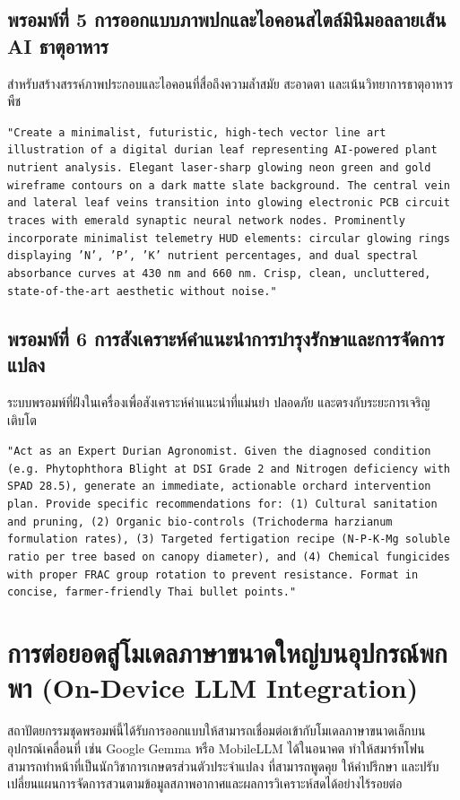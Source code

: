 \subsection{พรอมพ์ที่ 5 การออกแบบภาพปกและไอคอนสไตล์มินิมอลลายเส้น AI ธาตุอาหาร}
สำหรับสร้างสรรค์ภาพประกอบและไอคอนที่สื่อถึงความล้ำสมัย สะอาดตา และเน้นวิทยาการธาตุอาหารพืช

\begin{promptbox}[title={พรอมพ์ที่ 5 การสร้างสรรค์ภาพกราฟิกสไตล์มินิมอลลายเส้น AI ธาตุอาหารพืช}]
\texttt{"Create a minimalist, futuristic, high-tech vector line art illustration of a digital durian leaf representing AI-powered plant nutrient analysis. Elegant laser-sharp glowing neon green and gold wireframe contours on a dark matte slate background. The central vein and lateral leaf veins transition into glowing electronic PCB circuit traces with emerald synaptic neural network nodes. Prominently incorporate minimalist telemetry HUD elements: circular glowing rings displaying 'N', 'P', 'K' nutrient percentages, and dual spectral absorbance curves at 430 nm and 660 nm. Crisp, clean, uncluttered, state-of-the-art aesthetic without noise."}
\end{promptbox}

\subsection{พรอมพ์ที่ 6 การสังเคราะห์คำแนะนำการบำรุงรักษาและการจัดการแปลง}
ระบบพรอมพ์ที่ฝังในเครื่องเพื่อสังเคราะห์คำแนะนำที่แม่นยำ ปลอดภัย และตรงกับระยะการเจริญเติบโต

\begin{promptbox}[title={พรอมพ์ที่ 6 การสังเคราะห์คำแนะนำการดูแลรักษาและการให้ปุ๋ย}]
\texttt{"Act as an Expert Durian Agronomist. Given the diagnosed condition (e.g. Phytophthora Blight at DSI Grade 2 and Nitrogen deficiency with SPAD 28.5), generate an immediate, actionable orchard intervention plan. Provide specific recommendations for: (1) Cultural sanitation and pruning, (2) Organic bio-controls (Trichoderma harzianum formulation rates), (3) Targeted fertigation recipe (N-P-K-Mg soluble ratio per tree based on canopy diameter), and (4) Chemical fungicides with proper FRAC group rotation to prevent resistance. Format in concise, farmer-friendly Thai bullet points."}
\end{promptbox}

\section{การต่อยอดสู่โมเดลภาษาขนาดใหญ่บนอุปกรณ์พกพา (On-Device LLM Integration)}
สถาปัตยกรรมชุดพรอมพ์นี้ได้รับการออกแบบให้สามารถเชื่อมต่อเข้ากับโมเดลภาษาขนาดเล็กบนอุปกรณ์เคลื่อนที่ เช่น Google Gemma หรือ MobileLLM ได้ในอนาคต ทำให้สมาร์ทโฟนสามารถทำหน้าที่เป็นนักวิชาการเกษตรส่วนตัวประจำแปลง ที่สามารถพูดคุย ให้คำปรึกษา และปรับเปลี่ยนแผนการจัดการสวนตามข้อมูลสภาพอากาศและผลการวิเคราะห์สดได้อย่างไร้รอยต่อ

